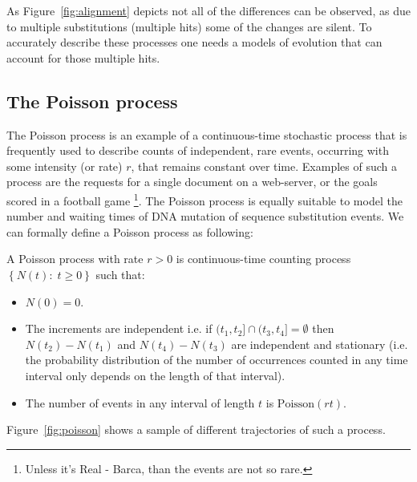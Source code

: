 As Figure~\ref{fig:alignment} depicts not all of the differences can be observed, as due to multiple substitutions (multiple hits) some of the changes are silent.
To accurately describe these processes one needs a models of evolution that can account for those multiple hits.

\subsection{The Poisson process\label{sub:poisson}}

The Poisson process is an example of a continuous-time stochastic process that is frequently used to describe counts of independent, rare events, occurring with some intensity (or rate) $r$, that remains constant over time. 
Examples of such a process are the requests for a single document on a web-server, or the goals scored in a football game \footnote{Unless it's Real - Barca, than the events are not so rare.}.%
The Poisson process is equally suitable to model the number and waiting times of DNA mutation of sequence substitution events. 
We can formally define a Poisson process as following:

\begin{definition} 
A Poisson process with rate $r>0$ is continuous-time counting process $\left\{ N(t):\; t\geq0\right\}$ such that:

\begin{itemize}
\item $N(0)=0$.
\item The increments are independent i.e. if $(t_{1},t_{2}]\cap(t_{3},t_{4}]=\emptyset$ then $N(t_2)-N(t_1)$ and $N(t_4)-N(t_3)$ are independent and stationary (i.e. the probability distribution of the number of occurrences counted in any time interval only depends on the length of that interval).
\item The number of events in any interval of length $t$ is $\text{Poisson}(r t)$.
\end{itemize}

Figure~\ref{fig:poisson} shows a sample of different trajectories of such a process.

\label{def:poisson}
\end{definition}


